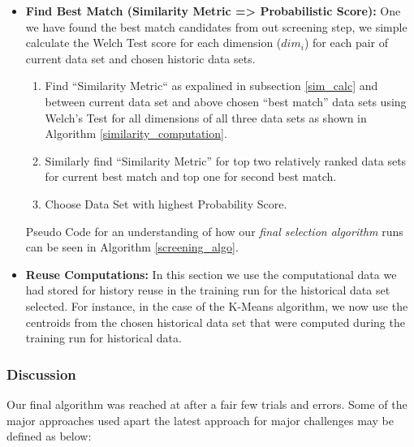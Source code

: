 \documentclass{vldb}
\begin{document}
\begin{itemize}
	\item \textbf{Find Best Match (Similarity Metric => Probabilistic Score):} 
	One we have found the best match candidates from out screening step, we simple calculate the Welch Test score for each dimension ($dim_i$) for each pair of current data set and chosen historic data sets.
		\begin{enumerate}
    			\item Find ``Similarity Metric`` as expalined in subsection \ref{sim_calc} and between current data set and above chosen “best match” data sets using Welch’s Test for all dimensions of all three data sets as shown in Algorithm \ref{similarity_computation}.
		    \item Similarly find “Similarity Metric” for top two relatively ranked data sets for current best match and top one for second best match.
		    \item Choose Data Set with highest Probability Score.
		\end{enumerate}
			Pseudo Code for an understanding of how our \textit{final selection algorithm} runs can be seen in Algorithm \ref{screening_algo}.	
	\item \textbf{Reuse Computations: }  In this section we use the computational data we had stored for history reuse in the training run for the historical data set selected. For instance, in the case of the K-Means algorithm, we now use the centroids from the chosen historical data set that were computed during the training run for historical data.
\end{itemize}

\subsubsection{Discussion}
Our final algorithm was reached at after a fair few trials and errors. Some of the major approaches used apart the latest approach for major challenges may be defined as below:
\end{document}
